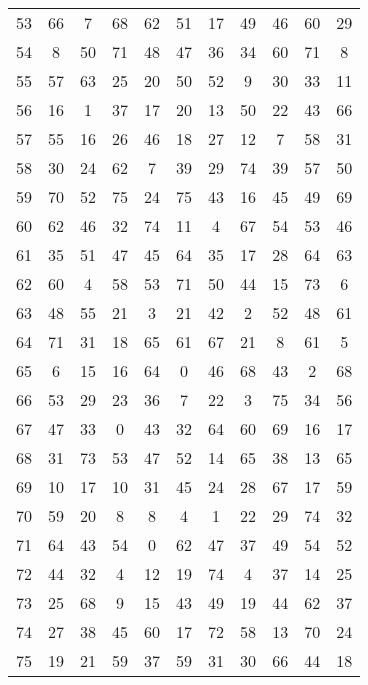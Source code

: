 \begin{table}
\begin{tabular}{c c c c c c c c c c c }
53 & 66 & 7 & 68 & 62 & 51 & 17 & 49 & 46 & 60 & 29 \\
54 & 8 & 50 & 71 & 48 & 47 & 36 & 34 & 60 & 71 & 8 \\
55 & 57 & 63 & 25 & 20 & 50 & 52 & 9 & 30 & 33 & 11 \\
56 & 16 & 1 & 37 & 17 & 20 & 13 & 50 & 22 & 43 & 66 \\
57 & 55 & 16 & 26 & 46 & 18 & 27 & 12 & 7 & 58 & 31 \\
58 & 30 & 24 & 62 & 7 & 39 & 29 & 74 & 39 & 57 & 50 \\
59 & 70 & 52 & 75 & 24 & 75 & 43 & 16 & 45 & 49 & 69 \\
60 & 62 & 46 & 32 & 74 & 11 & 4 & 67 & 54 & 53 & 46 \\
61 & 35 & 51 & 47 & 45 & 64 & 35 & 17 & 28 & 64 & 63 \\
62 & 60 & 4 & 58 & 53 & 71 & 50 & 44 & 15 & 73 & 6 \\
63 & 48 & 55 & 21 & 3 & 21 & 42 & 2 & 52 & 48 & 61 \\
64 & 71 & 31 & 18 & 65 & 61 & 67 & 21 & 8 & 61 & 5 \\
65 & 6 & 15 & 16 & 64 & 0 & 46 & 68 & 43 & 2 & 68 \\
66 & 53 & 29 & 23 & 36 & 7 & 22 & 3 & 75 & 34 & 56 \\
67 & 47 & 33 & 0 & 43 & 32 & 64 & 60 & 69 & 16 & 17 \\
68 & 31 & 73 & 53 & 47 & 52 & 14 & 65 & 38 & 13 & 65 \\
69 & 10 & 17 & 10 & 31 & 45 & 24 & 28 & 67 & 17 & 59 \\
70 & 59 & 20 & 8 & 8 & 4 & 1 & 22 & 29 & 74 & 32 \\
71 & 64 & 43 & 54 & 0 & 62 & 47 & 37 & 49 & 54 & 52 \\
72 & 44 & 32 & 4 & 12 & 19 & 74 & 4 & 37 & 14 & 25 \\
73 & 25 & 68 & 9 & 15 & 43 & 49 & 19 & 44 & 62 & 37 \\
74 & 27 & 38 & 45 & 60 & 17 & 72 & 58 & 13 & 70 & 24 \\
75 & 19 & 21 & 59 & 37 & 59 & 31 & 30 & 66 & 44 & 18 \\
\hline
\end{tabular}
\end{table}